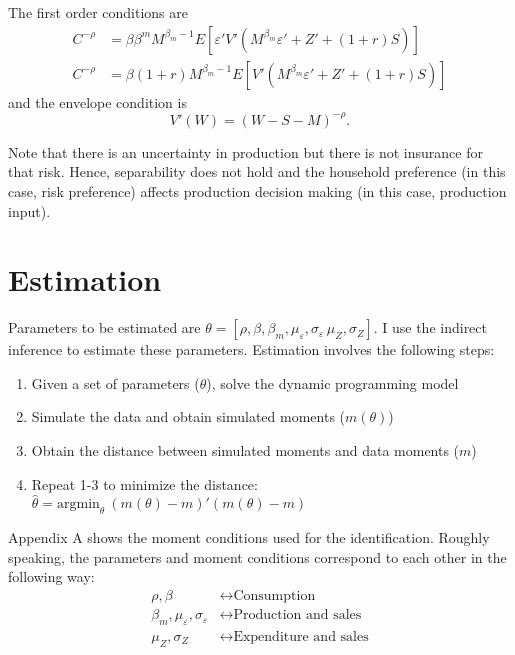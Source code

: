 \documentclass[12pt, fleqn]{article}
\begin{document}
The first order conditions are
\begin{align*}
  C^{-\rho} &= \beta \beta^m M^{\beta_m-1} E[\varepsilon' V'(M^{\beta_m} \varepsilon' + Z' + (1+r) S)] \\
  C^{-\rho} &= \beta (1+r) M^{\beta_m-1} E[V'(M^{\beta_m} \varepsilon' + Z' + (1+r) S)]
\end{align*}
and the envelope condition is
\begin{equation*}
  V'(W) = (W - S - M)^{- \rho}.
\end{equation*}

Note that there is an uncertainty in production but there is not insurance for that risk.
Hence, separability does not hold and the household preference (in this case, risk preference) affects production decision making (in this case, production input).

\section{Estimation}
Parameters to be estimated are $\theta = [\rho, \beta, \beta_m, \mu_{\varepsilon}, \sigma_{\varepsilon}\, \mu_{Z}, \sigma_{Z}]$.
I use the indirect inference to estimate these parameters.
Estimation involves the following steps:
\begin{enumerate}
  \item Given a set of parameters ($\theta$), solve the dynamic programming model
  \item Simulate the data and obtain simulated moments ($m(\theta)$)
  \item Obtain the distance between simulated moments and data moments ($m$)
  \item Repeat 1-3 to minimize the distance: $\widehat{\theta} = \text{argmin}_{\theta} \ (m(\theta) - m)' (m(\theta) - m)$
\end{enumerate}

Appendix A shows the moment conditions used for the identification.
Roughly speaking, the parameters and moment conditions correspond to each other in the following way:
\begin{align*}
  \rho, \beta                                               & \leftrightarrow \text{Consumption} \\
  \beta_m, \mu_{\varepsilon}, \sigma_{\varepsilon}          & \leftrightarrow \text{Production and sales} \\
  \mu_{Z}, \sigma_{Z}                                       & \leftrightarrow \text{Expenditure and sales}
\end{align*}
\end{document}
